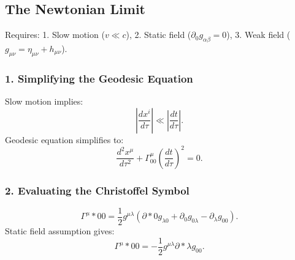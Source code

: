 \documentclass[11pt, a4paper]{report}
\begin{document}
\subsection*{The Newtonian Limit}
Requires: 1. Slow motion ($v \ll c$), 2. Static field ($\partial_{0} g_{\alpha\beta} = 0$), 3. Weak field ($g_{\mu\nu} = \eta_{\mu\nu} + h_{\mu\nu}$).

\subsubsection*{1. Simplifying the Geodesic Equation}
Slow motion implies:
\begin{equation}
\left| \frac{dx^{i}}{d\tau} \right| \ll \left| \frac{dt}{d\tau} \right|.
\end{equation}
Geodesic equation simplifies to:
\begin{equation}
\label{eq:geodesic_slow}
\frac{d^{2}x^{\mu}}{d\tau^{2}} + \Gamma^{\mu}_{00}\left(\frac{dt}{d\tau}\right)^{2} = 0.
\end{equation}

\subsubsection*{2. Evaluating the Christoffel Symbol}
\begin{equation}
\Gamma^{\mu}*{00} = \frac{1}{2}g^{\mu\lambda}(\partial*{0}g_{\lambda 0} + \partial_{0}g_{0\lambda} - \partial_{\lambda}g_{00}).
\end{equation}
Static field assumption gives:
\begin{equation}
\label{eq:gamma_00_static}
\Gamma^{\mu}*{00} = -\frac{1}{2}g^{\mu\lambda}\partial*{\lambda}g_{00}.
\end{equation}
\end{document}

